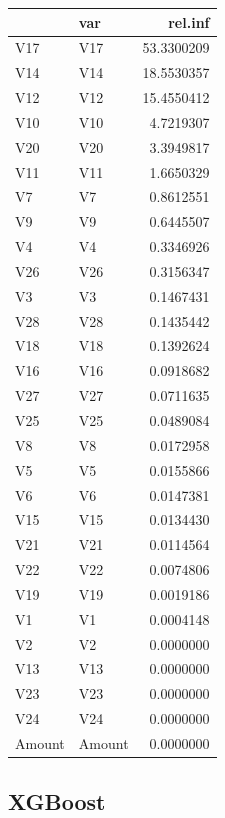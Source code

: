 \documentclass[]{article}
\begin{document}
\begin{table}[H]
\centering\begingroup\fontsize{10}{12}\selectfont

\begin{tabular}{l|l|r}
\hline
  & var & rel.inf\\
\hline
V17 & V17 & 53.3300209\\
\hline
V14 & V14 & 18.5530357\\
\hline
V12 & V12 & 15.4550412\\
\hline
V10 & V10 & 4.7219307\\
\hline
V20 & V20 & 3.3949817\\
\hline
V11 & V11 & 1.6650329\\
\hline
V7 & V7 & 0.8612551\\
\hline
V9 & V9 & 0.6445507\\
\hline
V4 & V4 & 0.3346926\\
\hline
V26 & V26 & 0.3156347\\
\hline
V3 & V3 & 0.1467431\\
\hline
V28 & V28 & 0.1435442\\
\hline
V18 & V18 & 0.1392624\\
\hline
V16 & V16 & 0.0918682\\
\hline
V27 & V27 & 0.0711635\\
\hline
V25 & V25 & 0.0489084\\
\hline
V8 & V8 & 0.0172958\\
\hline
V5 & V5 & 0.0155866\\
\hline
V6 & V6 & 0.0147381\\
\hline
V15 & V15 & 0.0134430\\
\hline
V21 & V21 & 0.0114564\\
\hline
V22 & V22 & 0.0074806\\
\hline
V19 & V19 & 0.0019186\\
\hline
V1 & V1 & 0.0004148\\
\hline
V2 & V2 & 0.0000000\\
\hline
V13 & V13 & 0.0000000\\
\hline
V23 & V23 & 0.0000000\\
\hline
V24 & V24 & 0.0000000\\
\hline
Amount & Amount & 0.0000000\\
\hline
\end{tabular}
\endgroup{}
\end{table}
\newpage

\hypertarget{xgboost}{%
\subsection{XGBoost}\label{xgboost}}
\end{document}
